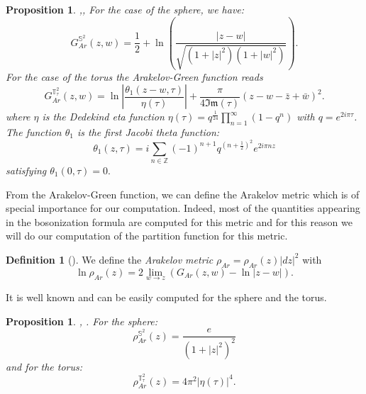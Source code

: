 \documentclass{article}
\newtheorem{Proposition}[theorem]{Proposition}
\theoremstyle{definition}
\newtheorem{Definition}[theorem]{Definition}
\theoremstyle{remark}
\begin{document}
\begin{Proposition}\cite[p.1176]{ArakelovSJ_1974},\cite[(B.1) p.457]{WentworthArakelov}, \cite[p.21]{Fay1992KernelFA}
    For the case of the sphere, we have:
    \[
    G_{Ar}^{\mathbb{S}^{2}}(z, w) = \frac{1}{2}+\ln\left(\frac{ |z - w|}{\sqrt{(1 + |z|^2)(1 + |w|^2)}}\right).
    \]
    For the case of the torus the Arakelov-Green function reads
    \[
    G_{Ar}^{\mathbb{T}^{2}_{\tau}}(z, w) = \ln\left| \frac{\theta_1(z - w, \tau)}{\eta(\tau)} \right| +  \frac{\pi}{4 \mathfrak{Im}(\tau)} (z - w - \bar{z} + \bar{w})^2.
    \]
                where $\eta$ is the Dedekind eta function $\eta(\tau)=q^{\frac{1}{24}}\prod_{n=1}^{\infty}(1-q^{n})$ with $q=e^{2i\pi \tau}$.
        The function $\theta_{1}$ is the first Jacobi theta function: 
    $$\theta_{1}(z,\tau)=i\sum_{n\in\mathbb{Z}}(-1)^{n+1}q^{\left(n+\frac{1}{2}\right)^{2}} e^{2i\pi nz}$$
satisfying $\theta_{1}(0,\tau)=0.$
\end{Proposition}
From the Arakelov-Green function, we can define the Arakelov metric which is of special importance for our computation. Indeed, most of the quantities appearing in the bosonization formula are computed for this metric and for this reason we will do our computation of the partition function for this metric.
\begin{Definition}[\cite{ArakelovSJ_1974,WentworthArakelov,WentworthGluing}]\label{ArMét}
    We define the \emph{Arakelov metric} $\rho_{Ar} = \rho_{Ar}(z) |dz|^2$ with
    \[
    \ln \rho_{Ar}(z) = 2 \lim_{w \to z} \left( G_{Ar}(z, w) - \ln |z - w| \right).
    \]
\end{Definition}
It is well known and  can be easily computed for the sphere and the torus. 
\begin{Proposition}\cite[(B.1) p.457]{WentworthArakelov}, \cite[p.21]{Fay1992KernelFA}. 
    For the sphere:
    \[
    \rho_{Ar}^{\mathbb{S}^{2}}(z) = \frac{e}{(1 + |z|^2)^2}
    \]
    and for the torus:
    \[
    \rho_{Ar}^{\mathbb{T}^{2}_{\tau}}(z) = 4\pi^2 |\eta(\tau)|^4.
    \]
\end{Proposition}
\end{document}
